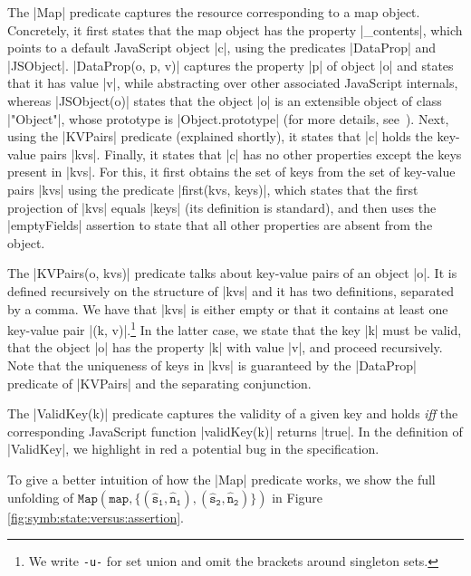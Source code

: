 The \jsinline|Map| predicate captures the resource corresponding to a map object. 
Concretely, it first states that the map object has the property \jsinline|_contents|, which points to a default JavaScript object \jsinline|c|, using the predicates \jsinline|DataProp| and \jsinline|JSObject|. 
\jsinline|DataProp(o, p, v)| captures the property \jsinline|p| of object \jsinline|o| and states that it has value \jsinline|v|, while abstracting over other associated JavaScript internals, whereas \jsinline|JSObject(o)| states that the object \jsinline|o| is an extensible object of class \jsinline|"Object"|, whose prototype is \jsinline|Object.prototype| (for more details, see~\cite{javert}). 
Next, using the \jsinline|KVPairs| predicate (explained shortly), it states that \jsinline|c| holds the key-value pairs \jsinline|kvs|. Finally, it states that \jsinline|c| has no other properties except the keys present in \jsinline|kvs|. For this, it first obtains the set of keys from the set of key-value pairs \jsinline|kvs| using the predicate \jsinline|first(kvs, keys)|, which states that the first projection of \jsinline|kvs| equals \jsinline|keys| (its definition is standard), and then uses the \jsinline|emptyFields| assertion to state that all other properties are absent from the object.

The \jsinline|KVPairs(o, kvs)| predicate talks about key-value pairs of an object \jsinline|o|. 
It is defined recursively on the structure of \jsinline|kvs| and it has two definitions, separated by a comma. 
We have that \jsinline|kvs| is either empty or that it contains at least one key-value pair \jsinline|(k, v)|.\footnote{We write {\small\texttt{-u-}} for set union and omit the brackets around singleton sets.} 
In the latter case, we state that the key \jsinline|k| must be valid, that the object \jsinline|o| has the property \jsinline|k| with value \jsinline|v|, and proceed recursively.
Note that the uniqueness of keys in \jsinline|kvs| is guaranteed by the \jsinline|DataProp| predicate of \jsinline|KVPairs| and the separating conjunction.

The \jsinline|ValidKey(k)| predicate captures the validity of a given key and holds \emph{iff} the corresponding JavaScript function \jsinline|validKey(k)| returns \jsinline|true|.
In the definition of \jsinline|ValidKey|, we highlight in red a potential bug in the specification.

To give a better intuition of how the \jsinline|Map| predicate works, we show the full unfolding of {\small$\mathtt{Map(map, \{ (\hat{s}_1, \hat{n}_1), (\hat{s}_2, \hat{n}_2) \} )}$} in Figure \ref{fig:symb:state:versus:assertion}.


